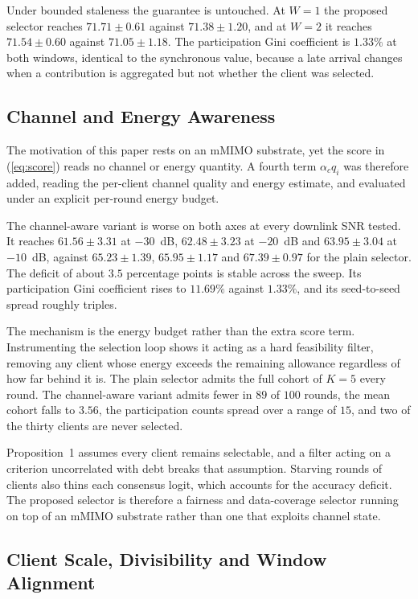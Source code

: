 \documentclass[journal]{IEEEtran}
\newcommand{\rev}[1]{{\color{blue}#1}}
\begin{document}
\rev{Under bounded staleness the guarantee is untouched. At $W = 1$ the proposed selector reaches $71.71 \pm 0.61$ against $71.38 \pm 1.20$, and at $W = 2$ it reaches $71.54 \pm 0.60$ against $71.05 \pm 1.18$. The participation Gini coefficient is $1.33\%$ at both windows, identical to the synchronous value, because a late arrival changes when a contribution is aggregated but not whether the client was selected.}

\subsection{Channel and Energy Awareness}
\label{ssec:exp-channel-aware}

\rev{The motivation of this paper rests on an mMIMO substrate, yet the score in (\ref{eq:score}) reads no channel or energy quantity. A fourth term $\alpha_c q_i$ was therefore added, reading the per-client channel quality and energy estimate, and evaluated under an explicit per-round energy budget.}

\rev{The channel-aware variant is worse on both axes at every downlink SNR tested. It reaches $61.56 \pm 3.31$ at $-30$~dB, $62.48 \pm 3.23$ at $-20$~dB and $63.95 \pm 3.04$ at $-10$~dB, against $65.23 \pm 1.39$, $65.95 \pm 1.17$ and $67.39 \pm 0.97$ for the plain selector. The deficit of about $3.5$ percentage points is stable across the sweep. Its participation Gini coefficient rises to $11.69\%$ against $1.33\%$, and its seed-to-seed spread roughly triples.}

\rev{The mechanism is the energy budget rather than the extra score term. Instrumenting the selection loop shows it acting as a hard feasibility filter, removing any client whose energy exceeds the remaining allowance regardless of how far behind it is. The plain selector admits the full cohort of $K = 5$ every round. The channel-aware variant admits fewer in $89$ of $100$ rounds, the mean cohort falls to $3.56$, the participation counts spread over a range of $15$, and two of the thirty clients are never selected.}

\rev{Proposition~1 assumes every client remains selectable, and a filter acting on a criterion uncorrelated with debt breaks that assumption. Starving rounds of clients also thins each consensus logit, which accounts for the accuracy deficit. The proposed selector is therefore a fairness and data-coverage selector running on top of an mMIMO substrate rather than one that exploits channel state.}

\subsection{Client Scale, Divisibility and Window Alignment}
\label{ssec:exp-scale}
\end{document}
